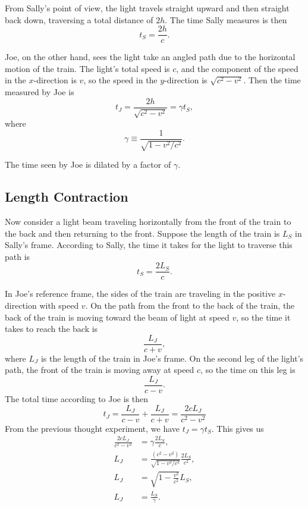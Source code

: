 From Sally's point of view, the light travels straight upward and then straight back down, traversing a total distance of $2h$. The time Sally measures is then \begin{equation}t_S = \frac{2h}{c}.\label{eq:ts} \end{equation}

Joe, on the other hand, sees the light take an angled path due to the horizontal motion of the train. The light's total speed is $c$, and the component of the speed in the $x$-direction is $v$, so the speed in the $y$-direction is $\sqrt{c^2-v^2}$. Then the time measured by Joe is \begin{equation} t_J = \frac{2h}{\sqrt{c^2-v^2}} = \gamma t_S, \label{eq:tj}\end{equation} where \begin{equation}\gamma \equiv \frac{1}{\sqrt{1-v^2/c^2}}.\label{eq:gamma} \end{equation}  

The time seen by Joe is dilated by a factor of $\gamma$.

\subsection*{Length Contraction}
Now consider a light beam traveling horizontally from the front of the train to the back and then returning to the front. Suppose the length of the train is $L_S$ in Sally's frame. According to Sally, the time it takes for the light to traverse this path is \begin{equation}t_S = \frac{2 L_S}{c}. \label{eq:tslc}\end{equation}

In Joe's reference frame, the sides of the train are traveling in the positive $x$-direction with speed $v$. On the path from the front to the back of the train, the back of the train is moving toward the beam of light at speed $v$, so the time it takes to reach the back is \begin{equation*}\frac{L_J}{c+v}, \end{equation*} where $L_J$ is the length of the train in Joe's frame. On the second leg of the light's path, the front of the train is moving away at speed $c$, so the time on this leg is \begin{equation*} \frac{L_J}{c-v}.\end{equation*} The total time according to Joe is then 
\begin{equation}
    t_J = \frac{L_J}{c-v} + \frac{L_J}{c+v} = \frac{2cL_J}{c^2-v^2}
    \label{eq:tjlc}
\end{equation}
From the previous thought experiment, we have $t_J = \gamma t_S$. This gives us
\begin{align}
    \frac{2cL_J}{c^2-v^2} &= \gamma \frac{2 L_S}{c}, \nonumber\\
    L_J &=  \frac{(c^2-v^2)}{\sqrt{1-v^2/c^2}} \frac{2 L_S}{c^2},\nonumber\\
    L_J &=  \sqrt{1-\frac{v^2}{c^2}} L_S,\nonumber\\
    L_J &= \frac{L_S}{\gamma}. 
\end{align}

